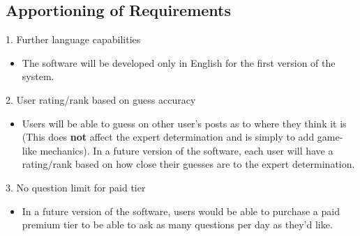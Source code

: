 \documentclass[]{article}
\begin{document}
\subsection{Apportioning of Requirements}
\label{sub:apportioning_of_requirements}
1. Further language capabilities
\begin{itemize}
	\item The software will be developed only in English for the first version
		of the system.
\end{itemize}
2. User rating/rank based on guess accuracy
\begin{itemize}
	\item Users will be able to guess on other user's posts as to where
		they think it is (This does \textbf{not} affect the expert determination
		and is simply to add game-like mechanics). In a future version of the software,
		each user will have a rating/rank
		based on how close their guesses are to the expert determination.
\end{itemize}
3. No question limit for paid tier
\begin{itemize}
	\item In a future version of the software, users would be able to
		purchase a paid premium tier to be able to ask as many questions
		per day as they'd like.
\end{itemize}

\end{document}
